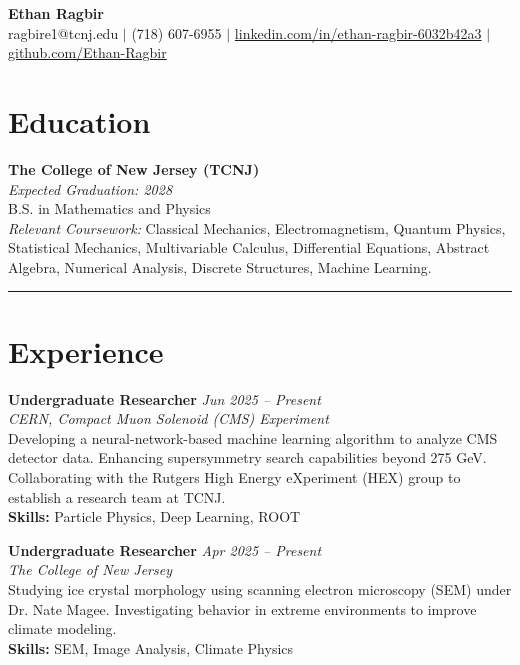 \documentclass[a4paper,10pt]{article}
\newcommand{\sectionline}{\noindent\rule{\linewidth}{0.5mm}}
\begin{document}
\begin{center}
    \textbf{\LARGE Ethan Ragbir} \\
    \vspace{2mm}
    ragbire1@tcnj.edu $\vert$ (718) 607-6955 $\vert$
    \href{https://www.linkedin.com/in/ethan-ragbir-6032b42a3}{linkedin.com/in/ethan-ragbir-6032b42a3} $\vert$ 
    \href{https://github.com/Ethan-Ragbir}{github.com/Ethan-Ragbir} \\
\end{center}

\section*{Education}
\textbf{The College of New Jersey (TCNJ)} \\
\textit{Expected Graduation: 2028} \\
B.S. in Mathematics and Physics \\
\textit{Relevant Coursework:} Classical Mechanics, Electromagnetism, Quantum Physics, Statistical Mechanics, Multivariable Calculus, Differential Equations, Abstract Algebra, Numerical Analysis, Discrete Structures, Machine Learning.



\sectionline

\section*{Experience}
\textbf{Undergraduate Researcher} \hfill \textit{Jun 2025 -- Present} \\
\textit{CERN, Compact Muon Solenoid (CMS) Experiment} \\
Developing a neural-network-based machine learning algorithm to analyze CMS detector data. Enhancing supersymmetry search capabilities beyond 275 GeV. Collaborating with the Rutgers High Energy eXperiment (HEX) group to establish a research team at TCNJ. \\
\textbf{Skills:} Particle Physics, Deep Learning, ROOT

\textbf{Undergraduate Researcher} \hfill \textit{Apr 2025 -- Present} \\
\textit{The College of New Jersey} \\
Studying ice crystal morphology using scanning electron microscopy (SEM) under Dr. Nate Magee. Investigating behavior in extreme environments to improve climate modeling. \\
\textbf{Skills:} SEM, Image Analysis, Climate Physics
\end{document}
